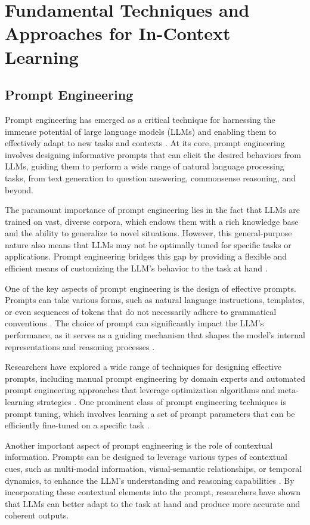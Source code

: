 \documentclass[11pt]{article}
\begin{document}
\section{Fundamental Techniques and Approaches for In-Context Learning}

\subsection{Prompt Engineering}

Prompt engineering has emerged as a critical technique for harnessing the immense potential of large language models (LLMs) and enabling them to effectively adapt to new tasks and contexts \cite{ref80,ref81}. At its core, prompt engineering involves designing informative prompts that can elicit the desired behaviors from LLMs, guiding them to perform a wide range of natural language processing tasks, from text generation to question answering, commonsense reasoning, and beyond.

The paramount importance of prompt engineering lies in the fact that LLMs are trained on vast, diverse corpora, which endows them with a rich knowledge base and the ability to generalize to novel situations. However, this general-purpose nature also means that LLMs may not be optimally tuned for specific tasks or applications. Prompt engineering bridges this gap by providing a flexible and efficient means of customizing the LLM's behavior to the task at hand \cite{ref82}.

One of the key aspects of prompt engineering is the design of effective prompts. Prompts can take various forms, such as natural language instructions, templates, or even sequences of tokens that do not necessarily adhere to grammatical conventions \cite{ref83}. The choice of prompt can significantly impact the LLM's performance, as it serves as a guiding mechanism that shapes the model's internal representations and reasoning processes \cite{ref84,ref85}.

Researchers have explored a wide range of techniques for designing effective prompts, including manual prompt engineering by domain experts and automated prompt engineering approaches that leverage optimization algorithms and meta-learning strategies \cite{ref86,ref87,ref88}. One prominent class of prompt engineering techniques is prompt tuning, which involves learning a set of prompt parameters that can be efficiently fine-tuned on a specific task \cite{ref89,ref90}.

Another important aspect of prompt engineering is the role of contextual information. Prompts can be designed to leverage various types of contextual cues, such as multi-modal information, visual-semantic relationships, or temporal dynamics, to enhance the LLM's understanding and reasoning capabilities \cite{ref91,ref92,ref93}. By incorporating these contextual elements into the prompt, researchers have shown that LLMs can better adapt to the task at hand and produce more accurate and coherent outputs.
\end{document}
